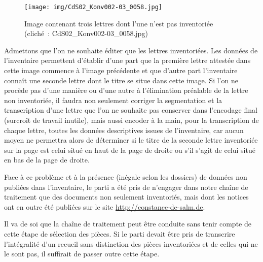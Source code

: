 \documentclass[a4paper,12pt,twoside]{book}
\begin{document}
				\begin{figure}[!h]
					\centering
					\texttt{[image: img/CdS02\_Konv002-03\_0058.jpg]}
					\caption{Image contenant trois lettres dont l'une n'est pas inventoriée (cliché~: CdS02\_Konv002-03\_0058.jpg)}
					\label{non-invent-58}
				\end{figure}
				
				Admettons que l'on ne souhaite éditer que les lettres inventoriées. Les données de l'inventaire permettent d'établir d'une part que la première lettre attestée dans cette image commence à l'image précédente et que d'autre part l'inventaire connaît une seconde lettre dont le titre se situe dans cette image. Si l'on ne procède pas d'une manière ou d'une autre à l'élimination préalable de la lettre non inventoriée, il faudra non seulement corriger la \gls{segmentation} et la transcription d'une lettre que l'on ne souhaite pas conserver dans l'encodage final (surcroît de travail inutile), mais aussi encoder à la main, pour la transcription de chaque lettre, toutes les données descriptives issues de l'inventaire, car aucun moyen ne permettra alors de déterminer si le titre de la seconde lettre inventoriée sur la page est celui situé en haut de la page de droite ou s'il s'agit de celui situé en bas de la page de droite.
				
				Face à ce problème et à la présence (inégale selon les dossiers) de données non publiées dans l'inventaire, le parti a été pris de n'engager dans notre chaîne de traitement que des documents non seulement inventoriés, mais dont les notices ont en outre été publiées sur le site \url{http://constance-de-salm.de}.
				
				Il va de soi que la chaîne de traitement peut être conduite sans tenir compte de cette étape de sélection des pièces. Si le parti devait être pris de transcrire l'intégralité d'un recueil sans distinction des pièces inventoriées et de celles qui ne le sont pas, il suffirait de passer outre cette étape.
				
\end{document}
